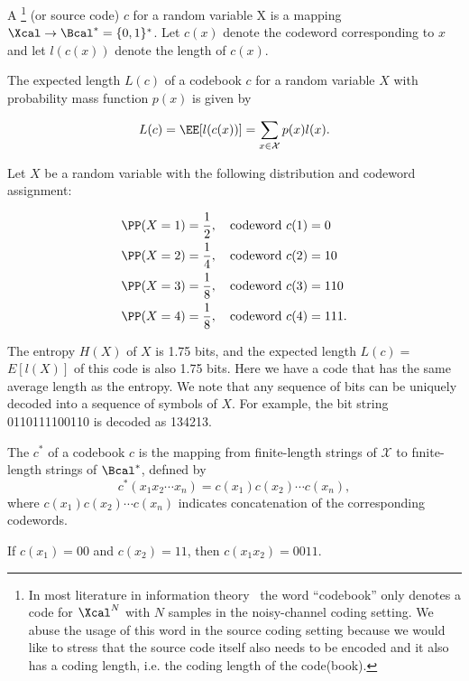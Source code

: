 \begin{definition}
    A \footnote{In most literature in information theory~\citep{shannon1948mathematical, cover1999elements} the word ``codebook'' only denotes a code for $\Xcal^N$ with $N$ samples in the noisy-channel coding setting. We abuse the usage of this word in the source coding setting because we would like to stress that the source code itself also needs to be encoded and it also has a coding length, i.e. the coding length of the code(book).} (or source code) $c$ for a random variable X is a mapping $\Xcal\to \Bcal^*=\{0,1\}^*$. Let $c(x)$ denote the codeword corresponding to $x$ and let $l(c(x))$ denote the length of $c(x)$.

    The expected length $L(c)$ of a codebook $c$ for a random variable $X$ with probability mass function $p(x)$ is given by

$$L(c)=\EE[l(c(x))] = \sum_{x\in\mathcal{X}}p(x)l(x).$$
\end{definition}
\begin{example}
Let $X$ be a random variable with the following distribution and codeword assignment:

$$\begin{aligned}
    &\PP(X=1)=\frac12,\quad\text{codeword }c(1)=0\\
    &\PP(X=2)=\frac14,\quad\text{codeword }c(2)=10\\
    &\PP(X=3)=\frac18,\quad\text{codeword }c(3)=110\\
    &\PP(X=4)=\frac18,\quad\text{codeword }c(4)=111.
    \end{aligned}$$

The entropy $H(X)$ of $X$ is 1.75 bits, and the expected length $L(c)=$ $E[l(X)]$ of this code is also 1.75 bits. Here we have a code that has the same average length as the entropy. We note that any sequence of bits can be uniquely decoded into a sequence of symbols of $X.$ For example, the bit string 0110111100110 is decoded as 134213.
\end{example}
\begin{definition}\label{def:extension_codebook}
    The  $c^*$ of a codebook $c$ is the mapping from finite-length strings of $\mathcal{X}$ to fınite-length strings of $\Bcal^*$, defıned by
    $$c^*(x_1x_2\cdots x_n)=c(x_1)c(x_2)\cdots c(x_n),$$
    where $c(x_1)c(x_2)\cdots c(x_n)$ indicates concatenation of the corresponding codewords.
\end{definition}
\begin{example}
    If $c(x_1)=00$ and $c(x_2)=11$, then $c(x_1 x_2)=0011$.
\end{example}
